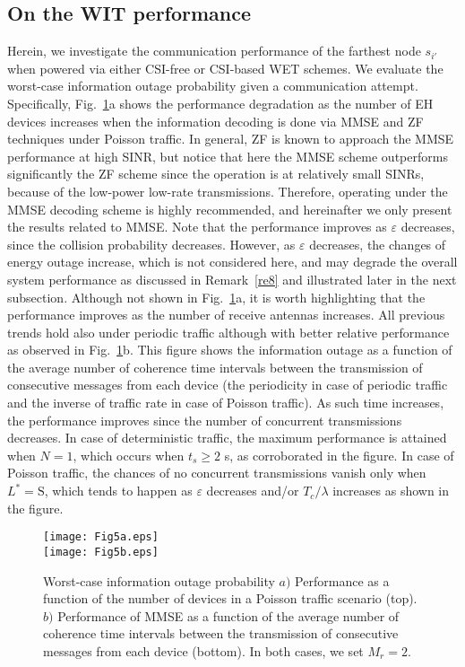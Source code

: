 \documentclass[10pt,journal,a4paper]{IEEEtran}
\begin{document}
	\subsection{On the WIT performance}\label{WITresults}
	Herein, we investigate the communication performance of the farthest node $s_{i'}$ when powered via either CSI-free or CSI-based WET schemes. We evaluate the worst-case information outage probability given a communication attempt. Specifically, Fig.~\ref{Fig5}a shows the performance degradation as the number of EH devices increases when the information decoding is done via MMSE and ZF techniques under Poisson traffic. In general, ZF is known to approach the MMSE performance at high SINR, but notice that here the MMSE scheme outperforms significantly the ZF scheme since the operation is at relatively small SINRs, because of the low-power low-rate transmissions. Therefore, operating under the MMSE decoding scheme is highly recommended, and hereinafter we only present the results related to MMSE. Note that the performance improves as $\varepsilon$ decreases, since the collision probability decreases. However, as $\varepsilon$ decreases, the changes of energy outage increase, which is not considered here, and may degrade the overall system performance as discussed in Remark~\ref{re8} and illustrated later in the next subsection. Although not shown in Fig.~\ref{Fig5}a, it is worth highlighting that the performance improves as the number of receive antennas increases. All previous trends hold  also under periodic traffic although with better relative performance as observed in Fig.~\ref{Fig5}b. This figure shows the information outage as a function of the average number of coherence time intervals between the transmission of consecutive messages from each device (the periodicity in case of periodic traffic and the inverse of traffic rate in case of Poisson traffic). As such time increases, the performance improves since the number of concurrent transmissions decreases. In case of deterministic traffic, the maximum performance is attained when $N=1$, which occurs when $t_s\ge 2$ s, as corroborated in the figure. In case of Poisson traffic, the chances of no concurrent transmissions vanish only when $L^*=\mathrm{S}$, which tends to happen as $\varepsilon$ decreases and/or $T_c/\lambda$ increases as shown in the figure. 
		\begin{figure}[t!]
		\texttt{[image: Fig5a.eps]}\vspace{3mm}\\
		\texttt{[image: Fig5b.eps]}
		\caption{Worst-case information outage probability $a)$ Performance as a function of the number of devices in a Poisson traffic scenario (top). $b)$ Performance of MMSE as a function of the average number of coherence time intervals between the transmission of consecutive messages from each device (bottom). In both cases, we set $M_r=2$.}			
		\label{Fig5}
	\end{figure}
\end{document}
